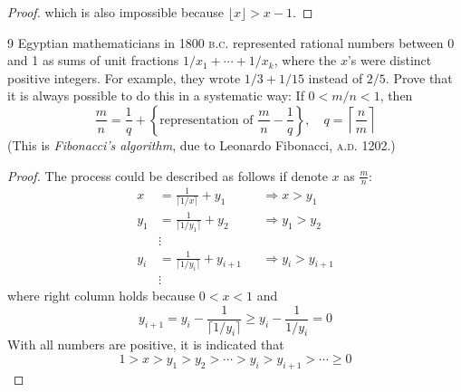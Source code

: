 \documentclass[a4paper,12pt]{article}
\theoremstyle{definition}
\newenvironment{problems}{\begin{list}{}{\renewcommand{\makelabel}[1]{\textbf{##1}\hfil}}}{\end{list}}
\begin{document}
\begin{problems}
\begin{proof}
        which is also impossible because $\lfloor x\rfloor>x-1$.
    \end{proof}
    \item[9] Egyptian mathematicians in 1800 \textsc{b.c.} represented rational numbers between 0 and 1 as sums of unit fractions $1/x_1+\cdots+1/x_k$, where the $x$'s were distinct positive integers.  For example, they wrote $1/3+1/15$ instead of $2/5$.  Prove that it is always possible to do this in a systematic way:  If $0 < m/n < 1$, then
    \begin{equation*}
        \frac{m}{n} =\frac{1}{q} + \left\{\text{representation of }\frac{m}{n}-\frac{1}{q}\right\},\quad q=\left\lceil\frac{n}{m}\right\rceil
    \end{equation*} 
    (This is \emph{Fibonacci's algorithm}, due to Leonardo Fibonacci, \textsc{a.d.} 1202.)
    \begin{proof}
        The process could be described as follows if denote $x$ as $\frac{m}{n}$:
        \begin{align*}
            x &= \frac{1}{\lceil 1/x \rceil} + y_1 &&\Rightarrow x>y_1\\
            y_1 &= \frac{1}{\lceil 1/y_1 \rceil} + y_2 && \Rightarrow y_1>y_2\\
            &\vdots\\
            y_i &= \frac{1}{\lceil 1/y_i \rceil} + y_{i+1} && \Rightarrow y_i>y_{i+1}\\
            &\vdots
        \end{align*}
        where right column holds because $0<x<1$ and
        \begin{equation*}
            y_{i+1} = y_i - \frac{1}{\lceil 1/y_i\rceil} \geq y_i - \frac{1}{1/y_i} = 0
        \end{equation*}
        With all numbers are positive, it is indicated that
        \begin{equation*}
            1>x>y_1>y_2>\cdots>y_i>y_{i+1}>\cdots\geq 0
        \end{equation*}

\end{proof}
\end{problems}
\end{document}
